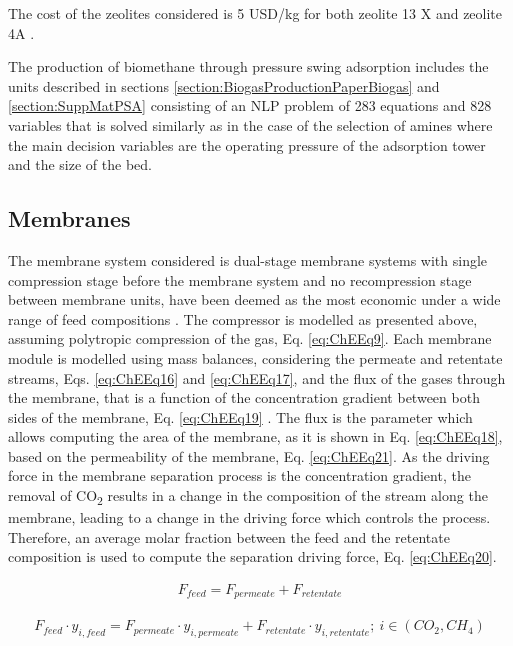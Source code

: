 \begin{refsection}[referencesCh7]
The cost of the zeolites considered is 5 USD/kg for both zeolite 13 X and zeolite 4A \citep{Xiao2013}. 
 
The production of biomethane through pressure swing adsorption includes the units described in sections \ref{section:BiogasProductionPaperBiogas} and \ref{section:SuppMatPSA} consisting of an NLP problem of 283 equations and 828 variables that is solved similarly as in the case of the selection of amines where the main decision variables are the operating pressure of the adsorption tower and the size of the bed.

\subsection{Membranes} \label{section:SuppMatMembranes}
The membrane system considered is dual-stage membrane systems with single compression stage before the membrane system and no recompression stage between membrane units, have been deemed as the most economic under a wide range of feed compositions \citep{kim2017optimization}. The compressor is modelled as presented above, assuming polytropic compression of the gas, Eq. \ref{eq:ChEEq9}. Each membrane module is modelled using mass balances, considering the permeate and retentate streams, Eqs. \ref{eq:ChEEq16} and \ref{eq:ChEEq17}, and the flux of the gases through the membrane, that is a function of the concentration gradient between both sides of the membrane, Eq. \ref{eq:ChEEq19} \citep{FernandesRodriguesMsc}. The flux is the parameter which allows computing the area of the membrane, as it is shown in Eq. \ref{eq:ChEEq18}, based on the permeability of the membrane, Eq. \ref{eq:ChEEq21}. As the driving force in the membrane separation process is the concentration gradient, the removal of CO\textsubscript{2} results in a change in the composition of the stream along the membrane, leading to a change in the driving force which controls the process. Therefore, an average molar fraction between the feed and the retentate composition is used to compute the separation driving force, Eq. \ref{eq:ChEEq20}. 

\begin{align}
F_{feed} = {F_{permeate}} + {F_{retentate}}  \label{eq:ChEEq16}
\end{align}

\begin{align}
F{}_{feed}\cdot{y_{i,feed}} = {F_{permeate}}\cdot{y_{i,permeate}} + {F_{retentate}}\cdot{y_{i,retentate}}; \ i \in (C{O_2},CH_{4}) \label{eq:ChEEq17}
\end{align}


\end{refsection}

